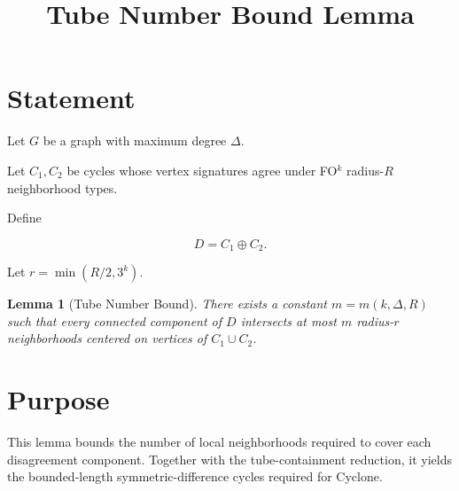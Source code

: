 \documentclass[11pt]{article}
\title{Tube Number Bound Lemma}
\date{}
\newtheorem{lemma}{Lemma}
\begin{document}
\maketitle

\section*{Statement}

Let \(G\) be a graph with maximum degree \(\Delta\).

Let \(C_1,C_2\) be cycles whose vertex signatures agree under
FO\(^{k}\) radius-\(R\) neighborhood types.

Define

\[
D = C_1 \oplus C_2 .
\]

Let \(r = \min(R/2,3^{k})\).

\begin{lemma}[Tube Number Bound]

There exists a constant \(m = m(k,\Delta,R)\) such that every connected
component of \(D\) intersects at most \(m\) radius-\(r\) neighborhoods
centered on vertices of \(C_1 \cup C_2\).

\end{lemma}

\section*{Purpose}

This lemma bounds the number of local neighborhoods required to cover
each disagreement component. Together with the tube-containment reduction,
it yields the bounded-length symmetric-difference cycles required for
Cyclone.
\end{document}
